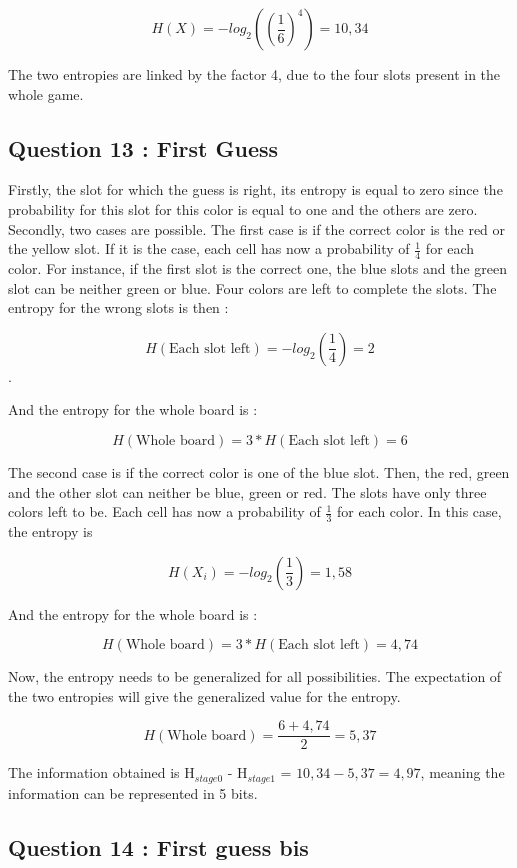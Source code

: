 \documentclass[titlepage]{article}
\begin{document}
$$ H(X) = - log_2\left(\left(\frac{1}{6}\right)^4\right) = 10,34$$

The two entropies are linked by the factor 4, due to the four slots present in the whole game. 

\subsection*{Question 13 : First Guess}

Firstly, the slot for which the guess is right, its entropy is equal to zero since the probability for this slot for this color is equal to one and the others are zero. Secondly, two cases are possible. The first case is if the correct color is the red or the yellow slot. If it is the case, each cell has now a probability of $\frac{1}{4}$ for each color. For instance, if the first slot is the correct one, the blue slots and the green slot can be neither green or blue. Four colors are left to complete the slots. The entropy for the wrong slots is then : 

$$H(\text{Each slot left}) = - log_2\left(\frac{1}{4}\right) = 2$$. 

And the entropy for the whole board is :

$$H(\text{Whole board}) = 3 * H(\text{Each slot left}) = 6$$

The second case is if the correct color is one of the blue slot. Then, the red, green and the other slot can neither be blue, green or red. The slots have only three colors left to be. Each cell has now a probability of $\frac{1}{3}$ for each color. In this case, the entropy is 

$$H(X_i) = - log_2\left(\frac{1}{3}\right) = 1,58$$

And the entropy for the whole board is : 

$$H(\text{Whole board}) = 3 * H(\text{Each slot left}) = 4,74$$

Now, the entropy needs to be generalized for all possibilities. The expectation of the two entropies will give the generalized value for the entropy. 

$$H(\text{Whole board}) = \frac{6 + 4,74}{2} = 5,37$$

The information obtained is H$_{stage0}$ - H$_{stage1}$ = $10,34 - 5,37 = 4,97$, meaning the information can be represented in 5 bits.

\subsection*{Question 14 : First guess bis}
\end{document}
